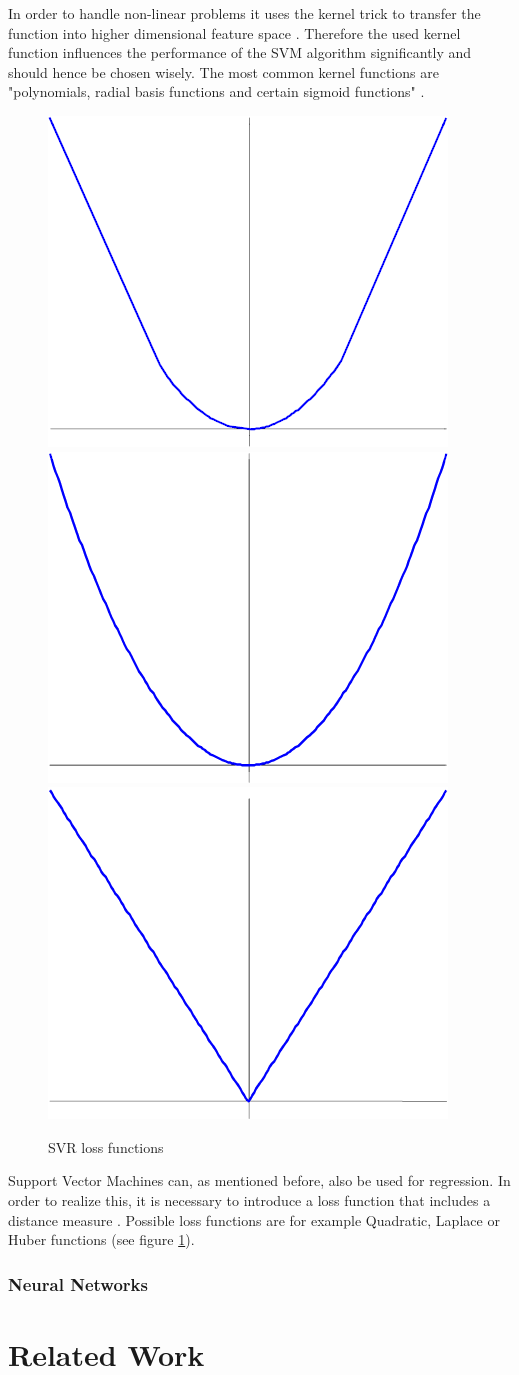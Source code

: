 \documentclass[
	ngerman,
	ruledheaders=section,%
	class=report,%
	thesis={type=master},%
	accentcolor=8c,%
	custommargins=false,%
	marginpar=false,%
	parskip=half-,%
	fontsize=11pt,%
]{tudapub}
\begin{document}
In order to handle non-linear problems it uses the kernel trick to transfer the function into higher dimensional feature space \cite{gunn1998support}. Therefore the used kernel function influences the performance of the SVM algorithm significantly and should hence be chosen wisely. The most common kernel functions are "polynomials, radial basis functions and certain
sigmoid functions" \cite{gunn1998support}.\\
\begin{figure}[hp]
\centering
\includegraphics[width=.25\textwidth]{data/basics/svr1.png}\hfill
\includegraphics[width=.25\textwidth]{data/basics/svr2.png}\hfill
\includegraphics[width=.25\textwidth]{data/basics/svr3.png}
\caption{SVR loss functions \cite{gunn1998support}}
\label{fig:svr}
\end{figure}
Support Vector Machines can, as mentioned before, also be used for regression. In order to realize this, it is necessary to introduce a loss function that includes a distance measure \cite{gunn1998support}. Possible loss functions are for example Quadratic, Laplace or Huber functions (see figure \ref{fig:svr}).
\subsection{Neural Networks}
\newpage
\chapter{Related Work}
\newpage
\end{document}
